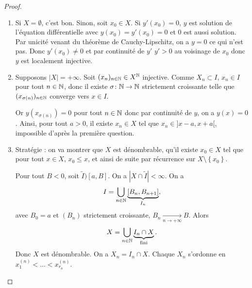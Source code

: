 \documentclass[12pt]{article}
\begin{document}
\begin{proof}
	\phantom{}
	\begin{enumerate}
		\item Si $X=\emptyset$, c'est bon. Sinon, soit $x_0\in X$. Si $y'(x_0)=0$, $y$ est solution de l'équation différentielle avec $y(x_0)=y'(x_0)=0$ et 0 est aussi solution. Par unicité venant du théorème de Cauchy-Lipschitz, on a $y=0$ ce qui n'est pas. Donc $y'(x_0)\neq0$ et par continuité de $y'$ $y'>0$ au voisinage de $x_0$ donc $y$ est localement injective.
		
		\item Supposons $\left\lvert X\right\rvert=+\infty$. Soit $(x_n)_{n\in\mathbb{N}}\in X^{\mathbb{N}}$ injective. Comme $X_n\subset I$, $x_n\in I$ pour tout $n\in\mathbb{N}$, donc il existe $\sigma\colon\mathbb{N}\to\mathbb{N}$ strictement croissante telle que $(x_{\sigma(n)})_{n\in\mathbb{N}}$ converge vers $x\in I$.
		
		Or $y(x_{\sigma(n)})=0$ pour tout $n\in\mathbb{N}$ donc par continuité de $y$, on a $y(x)=0$. Ainsi, pour tout $a>0$, il existe $x_n\in X$ tel que $x_n\in]x-a,x+a[$, impossible d'après la première question.

		\item Stratégie : on va montrer que $X$ est dénombrable, qu'il existe $x_0\in X$ tel que pour tout $x\in X$, $x_0\leqslant x$, et ainsi de suite par récurrence sur $X\setminus\left\lbrace x_0\right\rbrace$.
		
		Pour tout $B<0$, soit $\widetilde{I})[a,B]$. On a $\left\lvert X\cap\widetilde{I}\right\rvert<\infty$. On a 
		\begin{equation*}
			I=\bigcup_{n\in\mathbb{N}}\underbrace{[B_n, B_{n+1}]}_{I_n},
		\end{equation*}
		avec $B_0=a$ et $(B_n)$ strictement croissante, $B_n\xrightarrow[n\to+\infty]{}B$. Alors 
		\begin{equation*}
			X=\bigcup_{n\in\mathbb{N}}\underbrace{I_n\cap X}_{{\text{fini}}}.
		\end{equation*}
		Donc $X$ est dénombrable. On a $X_n=I_n\cap X$. Chaque $X_n$ s'ordonne en $x_1^{(n)}<\dots<x_{r_n}^{(n)}$.
	\end{enumerate}
\end{proof}
\end{document}
